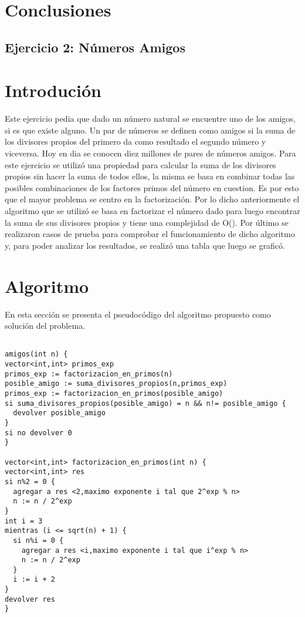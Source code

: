 \documentclass[a4paper, 12pt] {article}
\begin{document}
\section*{Conclusiones}

\newpage

\begin{center}
\section*{Ejercicio 2: N\'umeros Amigos}
\end{center}

\bigskip
\section*{Introduci\'on}
Este ejercicio pedia que dado un n\'umero natural se encuentre uno de los amigos, si es que existe alguno.
Un par de n\'umeros se definen como amigos si la suma de los divisores propios del primero da como resultado el segundo n\'umero y viceversa. Hoy en dia se conocen diez millones de pares de n\'umeros amigos.
Para este ejercicio se utiliz\'o una propiedad para calcular la suma de los divisores propios sin hacer la suma de todos ellos, la misma se basa en combinar todas las posibles combinaciones de los factores primos del n\'umero en cuestion. Es por esto que el mayor problema se centro en la factorizaci\'on.
Por lo dicho anteriormente el algoritmo que se utiliz\'o se basa en factorizar el n\'umero dado para luego encontrar la suma de sus divisores propios y tiene una complejidad de O(). Por \'ultimo se realizaron casos de prueba para comprobar el funcionamiento de dicho algoritmo y, para poder analizar los resultados, se realiz\'o una tabla que luego se grafic\'o. 
\section*{Algoritmo}
En esta secci\'on se presenta el pseudoc\'odigo del algoritmo propuesto como soluci\'on del problema.
\begin{verbatim}

amigos(int n) {
vector<int,int> primos_exp
primos_exp := factorizacion_en_primos(n)
posible_amigo := suma_divisores_propios(n,primos_exp)
primos_exp := factorizacion_en_primos(posible_amigo)
si suma_divisores_propios(posible_amigo) = n && n!= posible_amigo {
  devolver posible_amigo
}
si no devolver 0
}

vector<int,int> factorizacion_en_primos(int n) {
vector<int,int> res
si n%2 = 0 {
  agregar a res <2,maximo exponente i tal que 2^exp % n>
  n := n / 2^exp
}
int i = 3 
mientras (i <= sqrt(n) + 1) {
  si n%i = 0 {
    agregar a res <i,maximo exponente i tal que i^exp % n>
    n := n / 2^exp
  }
  i := i + 2
}
devolver res
}
\end{verbatim}
\end{document}
